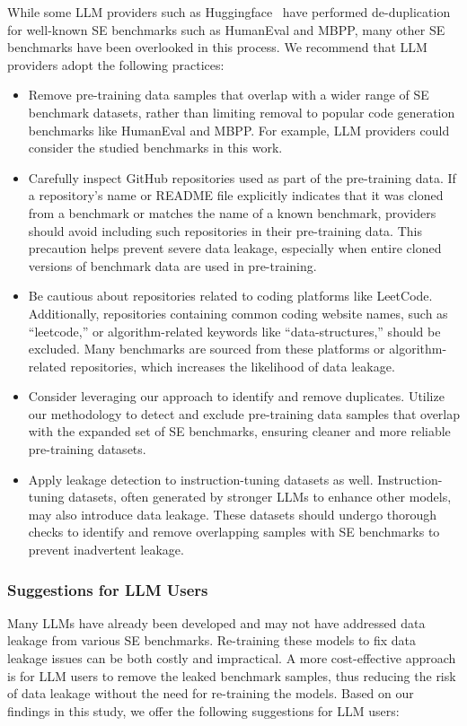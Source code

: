 While some LLM providers such as Huggingface~\cite{starcoder_one} have performed de-duplication for well-known SE benchmarks such as HumanEval and MBPP, many other SE benchmarks have been overlooked in this process.
We recommend that LLM providers adopt the following practices:
\begin{itemize}[leftmargin=*]
    \item Remove pre-training data samples that overlap with a wider range of SE benchmark datasets, rather than limiting removal to popular code generation benchmarks like HumanEval and MBPP. For example, LLM providers could consider the studied benchmarks in this work. 
    \item Carefully inspect GitHub repositories used as part of the pre-training data. If a repository's name or README file explicitly indicates that it was cloned from a benchmark or matches the name of a known benchmark, providers should avoid including such repositories in their pre-training data. This precaution helps prevent severe data leakage, especially when entire cloned versions of benchmark data are used in pre-training.
    \item Be cautious about repositories related to coding platforms like LeetCode. Additionally, repositories containing common coding website names, such as ``leetcode,'' or algorithm-related keywords like ``data-structures,'' should be excluded. Many benchmarks are sourced from these platforms or algorithm-related repositories, which increases the likelihood of data leakage.
    \item Consider leveraging our approach to identify and remove duplicates. Utilize our methodology to detect and exclude pre-training data samples that overlap with the expanded set of SE benchmarks, ensuring cleaner and more reliable pre-training datasets.
    \item Apply leakage detection to instruction-tuning datasets as well. Instruction-tuning datasets, often generated by stronger LLMs to enhance other models, may also introduce data leakage. These datasets should undergo thorough checks to identify and remove overlapping samples with SE benchmarks to prevent inadvertent leakage.
\end{itemize}


 
\subsubsection{\textbf{Suggestions for LLM Users}}
Many LLMs have already been developed and may not have addressed data leakage from various SE benchmarks. Re-training these models to fix data leakage issues can be both costly and impractical. A more cost-effective approach is for LLM users to remove the leaked benchmark samples, thus reducing the risk of data leakage without the need for re-training the models.
Based on our findings in this study, we offer the following suggestions for LLM users:

